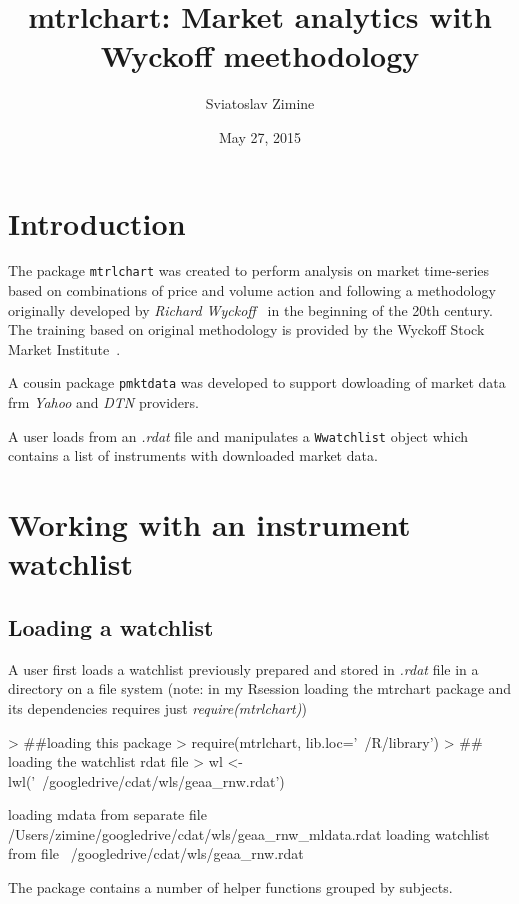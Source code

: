 \documentclass{article}
\title{\bf mtrlchart: Market analytics with Wyckoff meethodology }
\author{Sviatoslav Zimine}
\date{May 27, 2015}
\begin{document}
\maketitle
\tableofcontents
\section{Introduction}
The package {\tt mtrlchart} was created to perform analysis on market time-series based on combinations of price and volume action and following a methodology originally developed by {\sl Richard Wyckoff}~\cite{richardwyckoff} in the beginning of the 20th century. The training based on original methodology is provided by the Wyckoff Stock Market Institute~\cite{wyckoffinst}.

A cousin package {\tt pmktdata} was developed to support dowloading of market data frm {\sl Yahoo} and {\sl DTN} providers.

A user loads from an {\sl .rdat} file and manipulates a {\tt Wwatchlist} object which contains a list of instruments with downloaded market data. 
\section{Working with an instrument watchlist}

\subsection{Loading a watchlist}
A user first loads  a watchlist previously  prepared and stored in {\sl .rdat} file in a directory on a file system (note: in my Rsession loading the mtrchart package and its dependencies requires just {\sl require(mtrlchart)})

\begin{Schunk}
\begin{Sinput}
> ##loading this package
> require(mtrlchart, lib.loc='~/R/library')
> ## loading  the watchlist rdat file
> wl <- lwl('~/googledrive/cdat/wls/geaa_rnw.rdat')
\end{Sinput}
\begin{Soutput}
loading mdata from separate file  /Users/zimine/googledrive/cdat/wls/geaa_rnw_mldata.rdat 
loading watchlist from file  ~/googledrive/cdat/wls/geaa_rnw.rdat 
\end{Soutput}
\end{Schunk}
The package contains a number of helper functions grouped by subjects.
\end{document}
